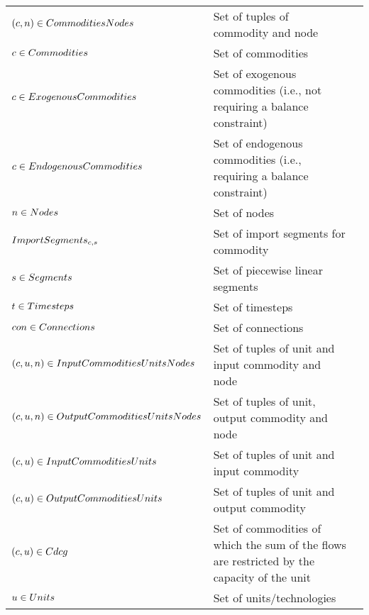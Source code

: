 	\begin{longtable}{p{\cola} p{\colc} >{\small\raggedleft\arraybackslash\itshape}p{\colb}}
		$(c, n) \in CommoditiesNodes$	& Set of tuples of commodity and node                         	&                \\
		$c \in Commodities   $	& Set of commodities                                          	&                \\
		$c \in ExogenousCommodities$	& Set of exogenous commodities (i.e., not requiring a balance constraint)	&                \\
		$c \in EndogenousCommodities$	& Set of endogenous commodities (i.e., requiring a balance constraint)	&                \\
		$n \in Nodes         $	& Set of nodes                                                	&                \\
		$ImportSegments_{c,s}$	& Set of import segments \segment for commodity \commodity    	&                \\
		$s \in Segments      $	& Set of piecewise linear segments                            	&                \\
		$t \in Timesteps     $	& Set of timesteps                                            	&                \\
		${con} \in Connections   $	& Set of connections                                          	&                \\
		$(c, u, n) \in InputCommoditiesUnitsNodes$	& Set of tuples of unit and input commodity and node          	&                \\
		$(c, u, n) \in OutputCommoditiesUnitsNodes$	& Set of tuples of unit, output commodity and node            	&                \\
		$(c, u) \in InputCommoditiesUnits$	& Set of tuples of unit and input commodity                   	&                \\
		$(c, u) \in OutputCommoditiesUnits$	& Set of tuples of unit and output commodity                  	&                \\
		$(c, u) \in Cdcg          $	& Set of commodities of which the sum of the flows are restricted by the capacity of the unit	&                \\
		$u \in Units         $	& Set of units/technologies                                   	&                \\
	\end{longtable}

